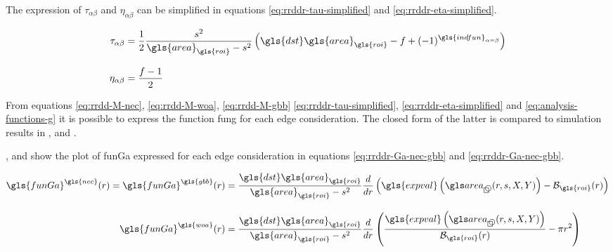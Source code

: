 \medskip

The expression of \( \tau_{\alpha \beta} \) and \( \eta_{\alpha \beta} \) can be simplified in equations \eqref{eq:rrddr-tau-simplified} and \eqref{eq:rrddr-eta-simplified}.

\begin{align}
  \tau_{\alpha \beta} &=
    \frac{1}{2} \frac{s^2}{\gls{area}_{\gls{roi}}-s^2} \left( \gls{dst} \gls{area}_{\gls{roi}} - f + (-1)^{\gls{indfun}_{\alpha = \beta}} \right)
    \label{eq:rrddr-tau-simplified}
  \\[3mm]
  \eta_{\alpha \beta} &=
    \frac{f-1}{2}
    \label{eq:rrddr-eta-simplified}
\end{align}

\medskip

From equations \eqref{eq:rrdd-M-nec}, \eqref{eq:rrdd-M-woa}, \eqref{eq:rrdd-M-gbb} \eqref{eq:rrddr-tau-simplified}, \eqref{eq:rrddr-eta-simplified} and \eqref{eq:analysis-functions-g} it is possible to express the function \gls{fung} for each edge consideration.
The closed form of the latter is compared to simulation results in ,  and .

%
%
%

\bigskip

,  and  show the plot of \gls{funGa} expressed for each edge consideration in equations \eqref{eq:rrddr-Ga-nec-gbb} and \eqref{eq:rrddr-Ga-nec-gbb}.

\begin{align}
  \gls{funGa}^{\gls{nec}} (r) =
  \gls{funGa}^{\gls{gbb}} (r) &=
    \frac{\gls{dst} \gls{area}_{\gls{roi}}}{ \gls{area}_{\gls{roi}} - s^2} \frac{d}{dr} \left( \gls{expval} \left( \cirsqr(r, s, X, Y) \right) - \mathcal{B}_{\gls{roi}} (r) \right)
    \label{eq:rrddr-Ga-nec-gbb}
  \\[3mm]
  \gls{funGa}^{\gls{woa}} (r) &=
    \frac{\gls{dst} \gls{area}_{\gls{roi}}}{ \gls{area}_{\gls{roi}} - s^2} \frac{d}{dr} \left( \frac{\gls{expval} \left( \cirsqr(r, s, X, Y) \right)}{\mathcal{B}_{\gls{roi}}(r)} - \pi r^2 \right)
    \label{eq:rrddr-Ga-woa}
\end{align}

